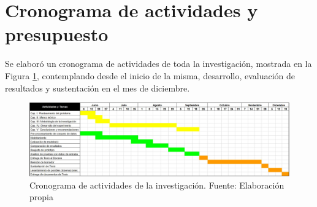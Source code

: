 \section{Cronograma de actividades y presupuesto}
Se elaboró un cronograma de actividades de toda la investigación, mostrada en la Figura \ref{3:fig2}, contemplando desde el inicio de la misma, desarrollo, evaluación de resultados y sustentación en el mes de diciembre.
\begin{figure}[h]
	\begin{center}
		\includegraphics[width=1.1\textwidth]{3/figures/cronograma.jpg}
		\caption{Cronograma de actividades de la investigación. Fuente: Elaboración propia}
		\label{3:fig2}
	\end{center}
\end{figure}